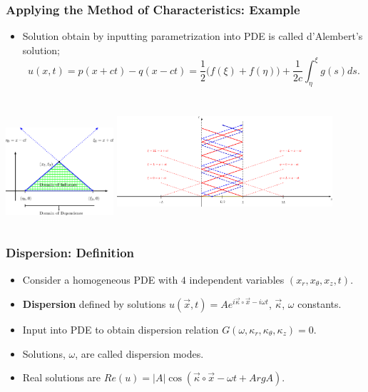 \documentclass{beamer}
\begin{document}
\begin{frame}
\frametitle{\textbf{Applying the Method of Characteristics:} Example}

\begin{itemize}
\item Solution obtain by inputting parametrization into PDE is called d'Alembert's solution;
$$u(x,t)=p(x+ct)-q(x-ct)=\frac{1}{2}\Big(f\left(\xi\right)+f\left(\eta\right)\Big)+\frac{1}{2c}\int_{\eta}^{\xi}g(s)ds.$$
\end{itemize}
\begin{columns}
\hspace{0.5cm}
\includegraphics[width=4cm]{IBVP1.eps}
\hspace{-1.5cm}
\includegraphics[width=8cm, height=4cm]{IBVP2.eps}
\end{columns}
\end{frame}

\begin{frame}
\frametitle{\textbf{Dispersion:} Definition}
\begin{itemize}
\item Consider a homogeneous PDE with $4$ independent variables $(x_r,x_\theta,x_z,t)$.
\item \textbf{Dispersion} defined by solutions $u(\vec{x},t)=Ae^{i\vec{\kappa}\circ\vec{x}-i\omega t}$, $\vec{\kappa}$, $\omega$ constants.
\item Input into PDE to obtain dispersion relation $G(\omega,\kappa_r,\kappa_\theta,\kappa_z)=0$.
\item Solutions, $\omega$, are called dispersion modes.
\item Real solutions are $Re(u)=|A|\cos{(\vec{\kappa}\circ\vec{x}-\omega t+ArgA)}$.
\end{itemize}
\end{frame}
\end{document}
